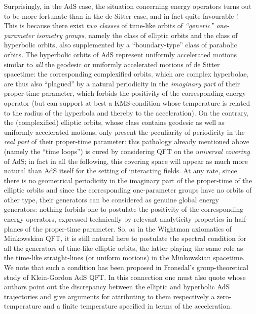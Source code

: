 \documentclass[a4paper,a4paper]{article}
\begin{document}
Surprisingly, in the AdS case, the situation concerning
energy operators turns out to be more fortunate than in the
de Sitter case, and in fact quite favourable !
This is because there exist {\sl two classes}
of time-like
orbits of {\sl ``generic'' one-parameter isometry groups},
namely the
class of elliptic orbits and the class of hyperbolic orbits,
also supplemented by a ``boundary-type'' class of
parabolic orbits.
The hyperbolic orbits of AdS represent uniformly accelerated
motions similar to {\sl all} the geodesic or
uniformly accelerated motions of de Sitter spacetime:
the corresponding complexified orbits,
which are complex hyperbolae, are
thus also ``plagued'' by a natural periodicity in the
{\sl imaginary part} of their proper-time parameter,
which forbids the positivity of the corresponding
energy operator (but can support at best a KMS-condition
whose temperature is related to the radius of the hyperbola
and thereby to the acceleration).
On the contrary, the (complexified) elliptic
orbits, whose class contains geodesic as well as
uniformly accelerated motions, only present the
peculiarity of periodicity in the {\sl real part}
of their proper-time parameter: this  pathology already
mentioned above (namely the ``time loops'') is
cured by considering QFT on the {\sl universal covering} of AdS;
in fact
in all the following, this covering space will appear as
much more natural than
AdS itself for the setting of interacting fields.
At any rate, since there is no geometrical periodicity in the
imaginary part of the proper-time of the elliptic orbits
and since the corresponding  one-parameter groups have no
orbits of other type, their generators can be considered as genuine
global energy generators:
nothing forbids one to postulate
the positivity of the corresponding energy operators,
expressed technically by relevant analyticity
properties in
half-planes of the proper-time parameter.
So, as in the Wightman axiomatics of Minkowskian QFT,
it is still natural here to postulate the spectral condition
for all the generators of time-like elliptic orbits,
the latter playing the same role as the time-like straight-lines
(or uniform motions) in the Minkowskian spacetime.
We note that such a condition has been proposed in
Fronsdal's group-theoretical study  \cite{Fronsdal:1974} of Klein-Gordon
AdS QFT. In this connection one must also quote \cite{Deser}
whose authors point out the discrepancy between
the elliptic and hyperbolic
AdS trajectories and give arguments for
attributing to them respectively a
zero-temperature and a finite temperature specified in terms of the
acceleration.
\end{document}

